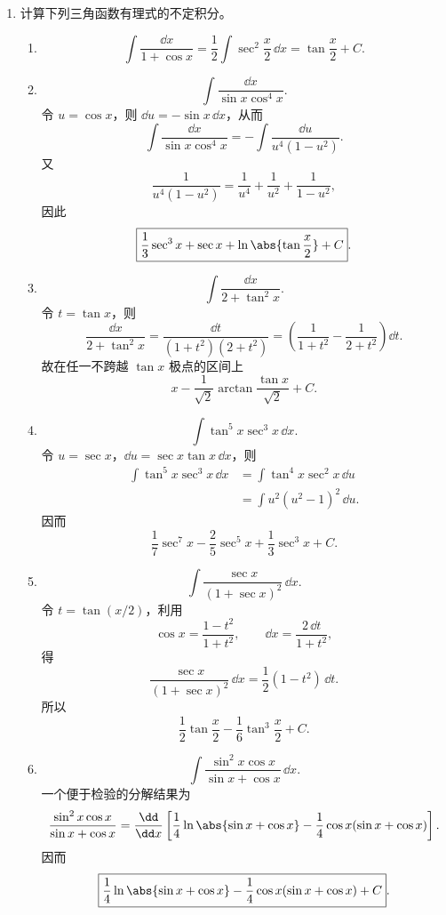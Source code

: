 \begin{enumerate}
  \item 计算下列三角函数有理式的不定积分。
  \begin{enumerate}[label=(\arabic*)]
    \item
    \[
      \int\frac{\dd x}{1+\cos x}
      =\frac12\int\sec^2\frac x2\,\dd x
      =\boxed{\tan\frac x2+C}.
    \]

    \item
    \[
      \int\frac{\dd x}{\sin x\cos^4x}.
    \]
    令 $u=\cos x$，则 $\dd u=-\sin x\,\dd x$，从而
    \[
      \int\frac{\dd x}{\sin x\cos^4x}
      =-\int\frac{\dd u}{u^4(1-u^2)}.
    \]
    又
    \[
      \frac1{u^4(1-u^2)}=\frac1{u^4}+\frac1{u^2}+\frac1{1-u^2},
    \]
    因此
    \[
      \boxed{
      \frac13\sec^3x+\sec x+\ln\abs{\tan\frac x2}+C}.
    \]

    \item
    \[
      \int\frac{\dd x}{2+\tan^2x}.
    \]
    令 $t=\tan x$，则
    \[
      \frac{\dd x}{2+\tan^2x}
      =\frac{\dd t}{(1+t^2)(2+t^2)}
      =\left(\frac1{1+t^2}-\frac1{2+t^2}\right)\dd t.
    \]
    故在任一不跨越 $\tan x$ 极点的区间上
    \[
      \boxed{x-\frac1{\sqrt2}\arctan\frac{\tan x}{\sqrt2}+C}.
    \]

    \item
    \[
      \int\tan^5x\sec^3x\,\dd x.
    \]
    令 $u=\sec x$，$\dd u=\sec x\tan x\,\dd x$，则
    \begin{align*}
      \int\tan^5x\sec^3x\,\dd x
      &=\int\tan^4x\sec^2x\,\dd u\\
      &=\int u^2(u^2-1)^2\,\dd u.
    \end{align*}
    因而
    \[
      \boxed{\frac17\sec^7x-\frac25\sec^5x+\frac13\sec^3x+C}.
    \]

    \item
    \[
      \int\frac{\sec x}{(1+\sec x)^2}\,\dd x.
    \]
    令 $t=\tan(x/2)$，利用
    \[
      \cos x=\frac{1-t^2}{1+t^2},
      \qquad
      \dd x=\frac{2\,\dd t}{1+t^2},
    \]
    得
    \[
      \frac{\sec x}{(1+\sec x)^2}\,\dd x
      =\frac12(1-t^2)\,\dd t.
    \]
    所以
    \[
      \boxed{\frac12\tan\frac x2-\frac16\tan^3\frac x2+C}.
    \]

    \item
    \[
      \int\frac{\sin^2x\cos x}{\sin x+\cos x}\,\dd x.
    \]
    一个便于检验的分解结果为
    \[
      \frac{\sin^2x\cos x}{\sin x+\cos x}
      =\frac{\dd}{\dd x}\left[
        \frac14\ln\abs{\sin x+\cos x}
        -\frac14\cos x(\sin x+\cos x)
      \right].
    \]
    因而
    \[
      \boxed{\frac14\ln\abs{\sin x+\cos x}
      -\frac14\cos x(\sin x+\cos x)+C}.
    \]


\end{enumerate}
\end{enumerate}
